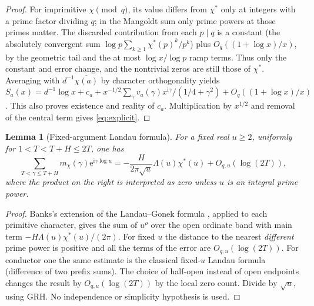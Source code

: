 \documentclass[11pt]{article}
\newtheorem{lemma}[theorem]{Lemma}
\theoremstyle{remark}\newtheorem{remark}[theorem]{Remark}
\newcommand{\ii}{\mathrm i}\newcommand{\e}{\mathrm e}\newcommand{\ph}{\varphi}
\begin{document}
\begin{proof}
For imprimitive $\chi\pmod q$, its value differs from $\chi^*$ only at integers with a prime factor dividing $q$; in the Mangoldt sum only prime powers at those primes matter. The discarded contribution from each $p\mid q$ is a constant (the absolutely convergent sum $\log p\sum_{k\ge1}\chi^*(p)^k/p^k$) plus $O_q((1+\log x)/x)$, by the geometric tail and the at most $\log x/\log p$ ramp terms. Thus only the constant and error change, and the nontrivial zeros are still those of $\chi^*$. Averaging with $d^{-1}\overline{\chi(a)}$ by character orthogonality yields $S_a(x)=d^{-1}\log x+c_a+x^{-1/2}\sum_\gamma v_a(\gamma)x^{\ii\gamma}/(1/4+\gamma^2)+O_q((1+\log x)/x)$. This also proves existence and reality of $c_a$. Multiplication by $x^{1/2}$ and removal of the central term gives \eqref{eq:explicit}.
\end{proof}

\begin{lemma}[Fixed-argument Landau formula]\label{lem:landau}
For a fixed real $u\ge2$, uniformly for $1<T<T+H\le 2T$, one has
\[
 \sum_{T<\gamma\le T+H}m_\chi(\gamma)\e^{\ii\gamma\log u}
 =-\frac{H}{2\pi\sqrt u}\Lambda(u)\chi^*(u)+O_{q,u}(\log(2T)),
\]
where the product on the right is interpreted as zero unless $u$ is an integral prime power.
\end{lemma}
\begin{proof}
Banks's extension of the Landau--Gonek formula \cite[Theorem 1.2]{banks}, applied to each primitive character, gives the sum of $u^\rho$ over the open ordinate band with main term $-H\Lambda(u)\chi^*(u)/(2\pi)$. For fixed $u$ the distance to the nearest \emph{different} prime power is positive and all the terms of the error are $O_{q,u}(\log(2T))$. For conductor one the same estimate is the classical fixed-$u$ Landau formula (difference of two prefix sums). The choice of half-open instead of open endpoints changes the result by $O_{q,u}(\log(2T))$ by the local zero count. Divide by $\sqrt u$, using GRH. No independence or simplicity hypothesis is used.
\end{proof}
\end{document}

